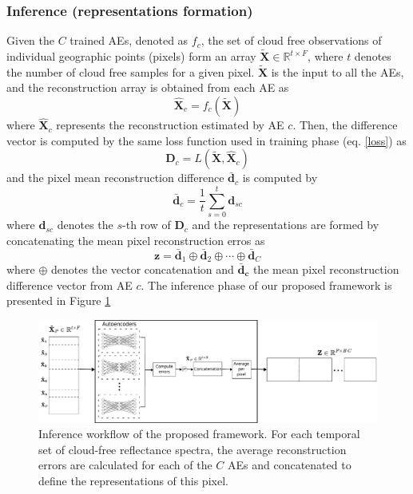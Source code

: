 \documentclass[journal,article,submit,pdftex,moreauthors]{Definitions/mdpi}
\begin{document}
\subsubsection{Inference (representations formation)}
Given the $C$ trained AEs, denoted as $f_c$, the set of cloud free observations of individual geographic points (pixels) form an array $\mathbf{\tilde{X}} \in \mathbb{R}^{t \times F}$, where $t$ denotes the number of cloud free samples for a given pixel. $\mathbf{\tilde{X}}$ is the input to all the AEs, and the reconstruction array is obtained from each AE as
\begin{equation}
	\mathbf{\hat{X}}_c = f_c(\mathbf{\tilde{X}}) 
\end{equation}
where $\mathbf{\hat{X}}_c$ represents the reconstruction estimated by AE $c$. Then, the difference vector is computed by the same loss function used in training phase (eq. \ref{loss}) as
\begin{equation}
    \mathbf{D}_c = L(\mathbf{\tilde{X}}, \mathbf{\hat{X}}_c)
\end{equation}
and the pixel mean reconstruction difference $\mathbf{\bar{d}}_c$ is computed by
\begin{equation}
	\mathbf{\bar{d}}_c = \frac{1}{t}\sum_{s=0}^{t}\mathbf{d}_{sc}
\end{equation} 
where $\mathbf{d}_{sc}$ denotes the $s$-th row of $\mathbf{D}_c$ and the representations are formed by concatenating the mean pixel reconstruction erros as
\begin{equation}
    \mathbf{z}=\mathbf{\bar{d}}_1 \oplus \mathbf{\bar{d}}_2 \oplus \cdots \oplus \mathbf{\bar{d}}_C
\end{equation}
where $\oplus$ denotes the vector concatenation and $\mathbf{\bar{d}_c}$ the mean pixel reconstruction difference vector from AE $c$.
The inference phase of our proposed framework is presented in Figure \ref{Inference}
\begin{figure}[H]
	\centering
	\includegraphics[width=\textwidth]{figures/testing.pdf}
	\caption{Inference workflow of the proposed framework. For each temporal set of cloud-free reflectance spectra, the average reconstruction errors are calculated for each of the $C$ AEs and concatenated to define the representations of this pixel.}
	\label{Inference}    
\end{figure}
\end{document}
